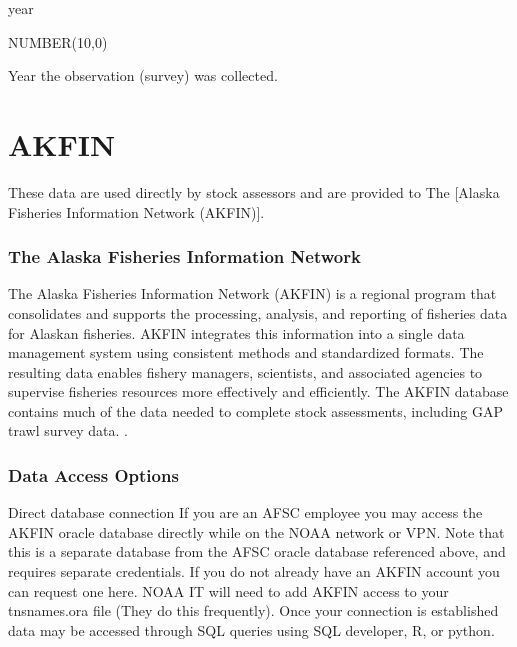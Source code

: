 \documentclass[
  letterpaper,
  oneside,
  open=any]{scrbook}
\begin{document}
year

NUMBER(10,0)

Year the observation (survey) was collected.

\part{AKFIN}

These data are used directly by stock assessors and are provided to The
{[}Alaska Fisheries Information Network (AKFIN){]}.

\hypertarget{the-alaska-fisheries-information-network}{%
\section*{The Alaska Fisheries Information
Network}\label{the-alaska-fisheries-information-network}}


The Alaska Fisheries Information Network (AKFIN) is a regional program
that consolidates and supports the processing, analysis, and reporting
of fisheries data for Alaskan fisheries. AKFIN integrates this
information into a single data management system using consistent
methods and standardized formats. The resulting data enables fishery
managers, scientists, and associated agencies to supervise fisheries
resources more effectively and efficiently. The AKFIN database contains
much of the data needed to complete stock assessments, including GAP
trawl survey data. .

\hypertarget{data-access-options}{%
\section*{Data Access Options}\label{data-access-options}}


Direct database connection If you are an AFSC employee you may access
the AKFIN oracle database directly while on the NOAA network or VPN.
Note that this is a separate database from the AFSC oracle database
referenced above, and requires separate credentials. If you do not
already have an AKFIN account you can request one here. NOAA IT will
need to add AKFIN access to your tnsnames.ora file (They do this
frequently). Once your connection is established data may be accessed
through SQL queries using SQL developer, R, or python.
\end{document}

